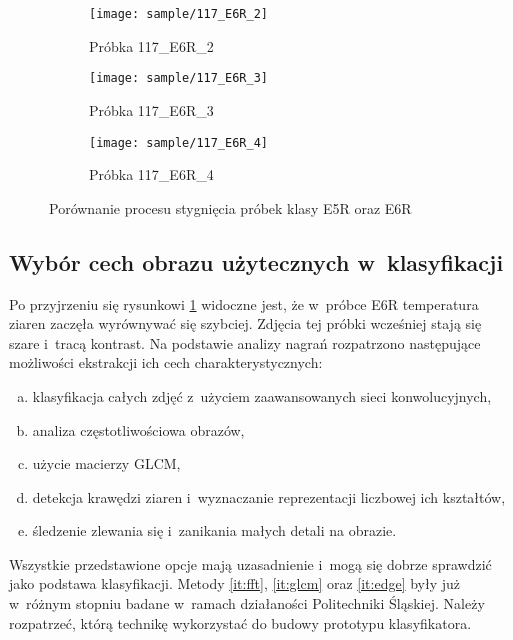 \begin{figure}[htbp]
\begin{subfigure}{0.3\textwidth}
	\end{subfigure}
	\hspace{0.25cm}
	\vspace{0.5cm}
	\begin{subfigure}{0.3\textwidth}
		\centering
		\texttt{[image: sample/117\_E6R\_2]}
		\caption{Próbka 117\_E6R\_2}
	\end{subfigure}
	\hspace{0.25cm}
	\begin{subfigure}{0.3\textwidth}
		\centering
		\texttt{[image: sample/117\_E6R\_3]}
		\caption{Próbka 117\_E6R\_3}
	\end{subfigure}
	\begin{subfigure}{0.3\textwidth}
		\centering
		\texttt{[image: sample/117\_E6R\_4]}
		\caption{Próbka 117\_E6R\_4}
	\end{subfigure}
	\caption{Porównanie procesu stygnięcia próbek klasy E5R oraz E6R}
	\label{fig:samplecompare}
\end{figure}

\subsection{Wybór cech obrazu użytecznych w~klasyfikacji}
\label{subsec:featureextr}
Po przyjrzeniu się rysunkowi \ref{fig:samplecompare} widoczne jest, że
w~próbce E6R temperatura ziaren zaczęła wyrównywać się szybciej.
Zdjęcia tej próbki wcześniej stają się szare i~tracą kontrast.
Na podstawie analizy nagrań rozpatrzono następujące możliwości ekstrakcji
ich cech charakterystycznych:
\begin{enumerate}[a)]
	\item \label{it:imgcnn} 
	      klasyfikacja całych zdjęć z~użyciem zaawansowanych sieci
	      konwolucyjnych,
	\item \label{it:fft} 
	      analiza częstotliwościowa obrazów,
	\item \label{it:glcm} 
	      użycie macierzy GLCM,
	\item \label{it:edge}
	      detekcja krawędzi ziaren i~wyznaczanie reprezentacji liczbowej
	      ich kształtów,
	\item \label{it:blob}
	      śledzenie zlewania się i~zanikania małych detali na obrazie.
\end{enumerate}
Wszystkie przedstawione opcje mają uzasadnienie i~mogą się dobrze sprawdzić
jako podstawa klasyfikacji.
Metody \ref{it:fft}, \ref{it:glcm} oraz \ref{it:edge} były już w~różnym
stopniu badane w~ramach działaności Politechniki Śląskiej.
Należy rozpatrzeć, którą technikę wykorzystać do budowy prototypu
klasyfikatora.


